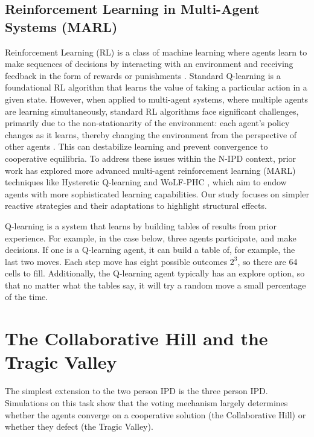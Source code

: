 \documentclass[]{llncs} %
\begin{document}
\subsection{Reinforcement Learning in Multi-Agent Systems (MARL)}
Reinforcement Learning (RL) is a class of machine learning where
agents learn to make sequences of decisions by interacting with an
environment and receiving feedback in the form of rewards or
punishments \cite{SuttonBarto2018}.  Standard Q-learning is a
foundational RL algorithm that learns the value of taking a particular
action in a given state. However, when applied to multi-agent
systems, where multiple agents are learning simultaneously, standard
RL algorithms face significant challenges, primarily due to the
non-stationarity of the environment: each agent's policy changes as it
learns, thereby changing the environment from the perspective of other
agents \cite{Busoniu2008}.  This can destabilize learning and prevent
convergence to cooperative equilibria. To address these issues within
the N-IPD context, prior work has explored more advanced multi-agent
reinforcement learning (MARL) techniques like Hysteretic Q-learning
\cite{Matignon2007Hysteretic} and WoLF-PHC \cite{Bowling2002WoLF},
which aim to endow agents with more sophisticated learning
capabilities. Our study focuses on simpler reactive strategies and
their adaptations to highlight structural effects.

Q-learning \cite {Watkins} is a system that learns by building tables
of results from prior experience.  For example, in the case below, three
agents participate, and make decisions.  If one is a Q-learning agent,
it can build a table of, for example, the last two moves.  Each step
move has eight possible outcomes $2^3$, so there are 64 cells to fill.
Additionally, the Q-learning agent typically has an explore option,
so that no matter what the tables say, it will try a random move a
small percentage of the time.  


\section{The Collaborative Hill and the Tragic Valley}
\label{sec:tragicValley}

The simplest extension to the two person IPD is the three person IPD.
Simulations on this task show that the voting mechanism largely determines
whether the agents converge on a cooperative solution (the Collaborative
Hill) or whether they defect (the Tragic Valley).
\end{document}
